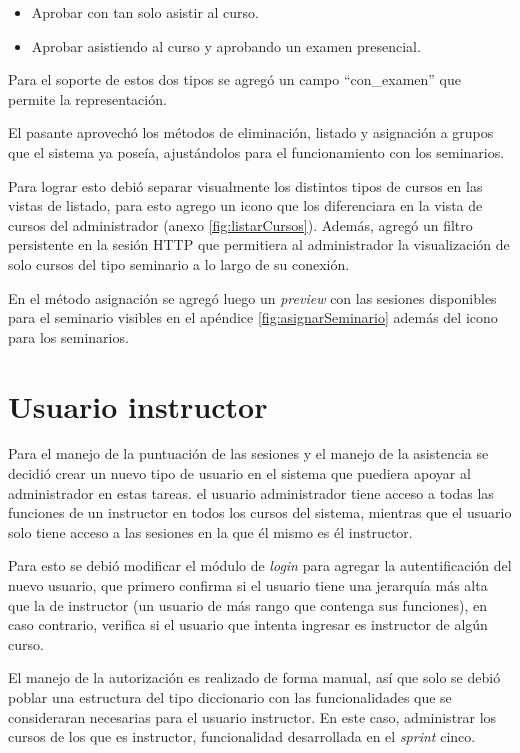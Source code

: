 	\begin{itemize}
		\item Aprobar con tan solo asistir al curso.
		\item Aprobar asistiendo al curso y aprobando un examen presencial.
	\end{itemize}

	Para el soporte de estos dos tipos se agregó un campo ``con\_examen'' que permite la representación.

	El pasante aprovechó los métodos de eliminación, listado y asignación a grupos que el sistema ya poseía, ajustándolos para el funcionamiento con los seminarios. 

	Para lograr esto debió separar visualmente los distintos tipos de cursos en las vistas de listado, para esto agrego un icono que los diferenciara en la vista de cursos del administrador (anexo \ref{fig:listarCursos}). Además, agregó un filtro persistente en la sesión HTTP que permitiera al administrador la visualización de solo cursos del tipo seminario a lo largo de su conexión.

	En el método asignación se agregó luego un \emph{preview} con las sesiones disponibles para el seminario visibles en el apéndice \ref{fig:asignarSeminario} además del icono para los seminarios. 


	\section{Usuario instructor} %
	\label{sec:usuario_instructor}
	
	Para el manejo de la puntuación de las sesiones y el manejo de la asistencia se decidió crear un nuevo tipo de usuario en el sistema que puediera apoyar al administrador en estas tareas. el usuario administrador tiene acceso a todas las funciones de un instructor en todos los cursos del sistema, mientras que el usuario solo tiene acceso a las sesiones en la que él mismo es él instructor.

	Para esto se debió modificar el módulo de \emph{login} para agregar la autentificación del nuevo usuario, que primero confirma si el usuario tiene una jerarquía más alta que la de instructor (un usuario de más rango que contenga sus funciones), en caso contrario, verifica si el usuario que intenta ingresar es instructor de algún curso.

	El manejo de la autorización es realizado de forma manual, así que solo se debió poblar una estructura del tipo diccionario con las funcionalidades que se consideraran necesarias para el usuario instructor. En este caso, administrar los cursos de los que es instructor, funcionalidad desarrollada en el \emph{sprint} cinco.
	
